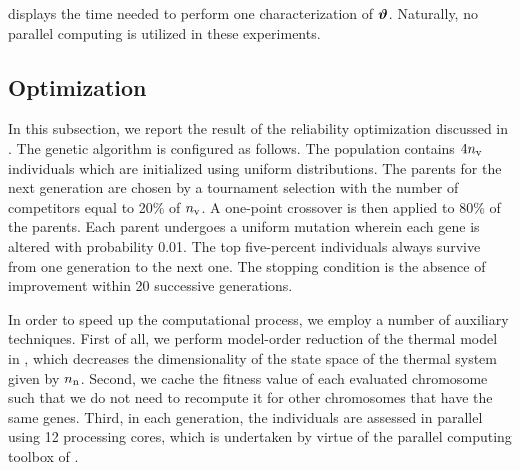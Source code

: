  displays the time needed to perform one characterization of $\bm{\vartheta}$.
Naturally, no parallel computing is utilized in these experiments.


\subsection{Optimization} 
In this subsection, we report the result of the reliability optimization discussed in .
The genetic algorithm is configured as follows.
The population contains $4 {n_\text{v}}$ individuals which are initialized using uniform distributions.
The parents for the next generation are chosen by a tournament selection with the number of competitors equal to 20\% of ${n_\text{v}}$.
A one-point crossover is then applied to 80\% of the parents.
Each parent undergoes a uniform mutation wherein each gene is altered with probability 0.01.
The top five-percent individuals always survive from one generation to the next one.
The stopping condition is the absence of improvement within 20 successive generations.


In order to speed up the computational process, we employ a number of auxiliary techniques.
First of all, we perform model-order reduction of the thermal model in , which decreases the dimensionality of the state space of the thermal system given by ${n_\text{n}}$.
Second, we cache the fitness value of each evaluated chromosome such that we do not need to recompute it for other chromosomes that have the same genes.
Third, in each generation, the individuals are assessed in parallel using 12 processing cores, which is undertaken by virtue of the parallel computing toolbox of  \cite{matlab}.
